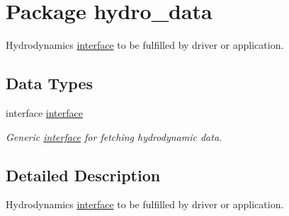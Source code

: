 \hypertarget{a00063}{
\section{Package hydro\_\-data}
\label{a00063}
}
Hydrodynamics \hyperlink{a00001}{interface} to be fulfilled by driver or application.  


\subsection*{Data Types}
\begin{CompactItemize}
\item 
interface \hyperlink{a00001}{interface}
\begin{CompactList}\small\item\em Generic \hyperlink{a00001}{interface} for fetching hydrodynamic data. \item\end{CompactList}\end{CompactItemize}


\subsection{Detailed Description}
Hydrodynamics \hyperlink{a00001}{interface} to be fulfilled by driver or application. 

